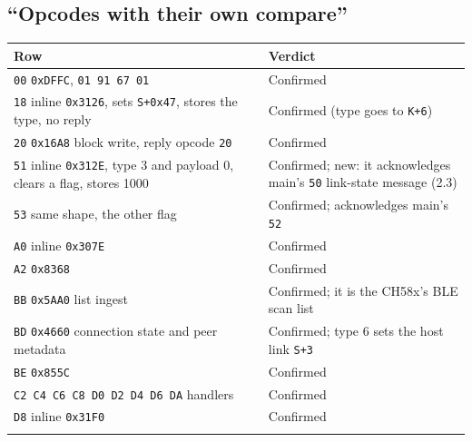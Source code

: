 \subsection{``Opcodes with their own
compare''}\label{opcodes-with-their-own-compare}

{\def\LTcaptype{none} %
\begin{longtable}[]{@{}
  >{\raggedright\arraybackslash}p{}
  >{\raggedright\arraybackslash}p{}@{}}
\toprule\noalign{}
\begin{minipage}[b]{\linewidth}\raggedright
Row
\end{minipage} & \begin{minipage}[b]{\linewidth}\raggedright
Verdict
\end{minipage} \\
\midrule\noalign{}
\endhead
\bottomrule\noalign{}
\endlastfoot
\texttt{00} \texttt{0xDFFC}, \texttt{01\ 91\ 67\ 01} & Confirmed \\
\texttt{18} inline \texttt{0x3126}, sets \texttt{S+0x47}, stores the
type, no reply & Confirmed (type goes to \texttt{K+6}) \\
\texttt{20} \texttt{0x16A8} block write, reply opcode \texttt{20} &
Confirmed \\
\texttt{51} inline \texttt{0x312E}, type 3 and payload 0, clears a flag,
stores 1000 & Confirmed; new: it acknowledges main's \texttt{50}
link-state message (2.3) \\
\texttt{53} same shape, the other flag & Confirmed; acknowledges main's
\texttt{52} \\
\texttt{A0} inline \texttt{0x307E} & Confirmed \\
\texttt{A2} \texttt{0x8368} & Confirmed \\
\texttt{BB} \texttt{0x5AA0} list ingest & Confirmed; it is the CH58x's
BLE scan list \\
\texttt{BD} \texttt{0x4660} connection state and peer metadata &
Confirmed; type 6 sets the host link \texttt{S+3} \\
\texttt{BE} \texttt{0x855C} & Confirmed \\
\texttt{C2\ C4\ C6\ C8\ D0\ D2\ D4\ D6\ DA} handlers & Confirmed \\
\texttt{D8} inline \texttt{0x31F0} & Confirmed \\*
\end{longtable}
}

